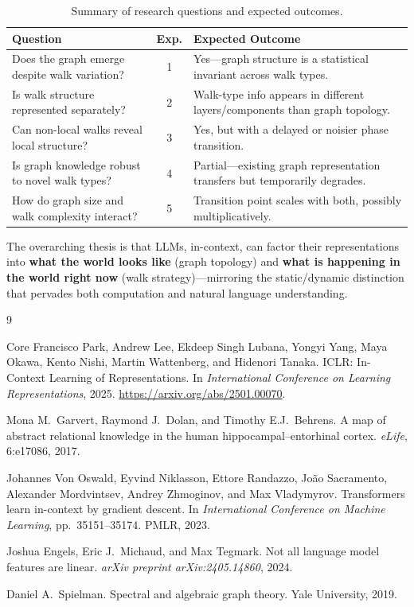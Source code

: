 \documentclass[11pt]{article}
\begin{document}
\begin{table}[h]
\centering
\renewcommand{\arraystretch}{1.3}
\begin{tabular}{@{}p{5cm}cp{6.5cm}@{}}
\toprule
\textbf{Question} & \textbf{Exp.} & \textbf{Expected Outcome} \\
\midrule
Does the graph emerge despite walk variation? & 1 & Yes---graph structure is a statistical invariant across walk types. \\
Is walk structure represented separately? & 2 & Walk-type info appears in different layers/components than graph topology. \\
Can non-local walks reveal local structure? & 3 & Yes, but with a delayed or noisier phase transition. \\
Is graph knowledge robust to novel walk types? & 4 & Partial---existing graph representation transfers but temporarily degrades. \\
How do graph size and walk complexity interact? & 5 & Transition point scales with both, possibly multiplicatively. \\
\bottomrule
\end{tabular}
\caption{Summary of research questions and expected outcomes.}
\end{table}

The overarching thesis is that LLMs, in-context, can factor their representations into \textbf{what the world looks like} (graph topology) and \textbf{what is happening in the world right now} (walk strategy)---mirroring the static/dynamic distinction that pervades both computation and natural language understanding.

\begin{thebibliography}{9}

Core Francisco Park, Andrew Lee, Ekdeep Singh Lubana, Yongyi Yang, Maya Okawa, Kento Nishi, Martin Wattenberg, and Hidenori Tanaka.
\newblock ICLR: In-Context Learning of Representations.
\newblock In \emph{International Conference on Learning Representations}, 2025.
\newblock \url{https://arxiv.org/abs/2501.00070}.

Mona M.\ Garvert, Raymond J.\ Dolan, and Timothy E.J.\ Behrens.
\newblock A map of abstract relational knowledge in the human hippocampal--entorhinal cortex.
\newblock \emph{eLife}, 6:e17086, 2017.

Johannes Von Oswald, Eyvind Niklasson, Ettore Randazzo, Jo\~{a}o Sacramento, Alexander Mordvintsev, Andrey Zhmoginov, and Max Vladymyrov.
\newblock Transformers learn in-context by gradient descent.
\newblock In \emph{International Conference on Machine Learning}, pp.\ 35151--35174. PMLR, 2023.

Joshua Engels, Eric J.\ Michaud, and Max Tegmark.
\newblock Not all language model features are linear.
\newblock \emph{arXiv preprint arXiv:2405.14860}, 2024.

Daniel A.\ Spielman.
\newblock Spectral and algebraic graph theory.
\newblock Yale University, 2019.

\end{thebibliography}
\end{document}
